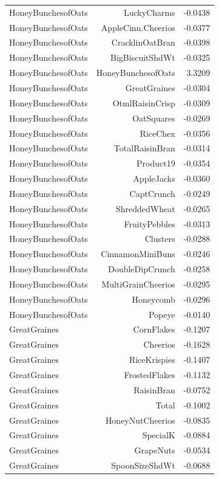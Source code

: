 \begin{longtable}{@{}lrr@{}}
HoneyBunchesofOats & LuckyCharms & -0.0438 \\
HoneyBunchesofOats & AppleCinn.Cheerios & -0.0377 \\
HoneyBunchesofOats & CracklinOatBran & -0.0398 \\
HoneyBunchesofOats & BigBiscuitShdWt & -0.0325 \\
HoneyBunchesofOats & HoneyBunchesofOats & 3.3209 \\
HoneyBunchesofOats & GreatGraines & -0.0304 \\
HoneyBunchesofOats & OtmlRaisinCrisp & -0.0309 \\
HoneyBunchesofOats & OatSquares & -0.0269 \\
HoneyBunchesofOats & RiceChex & -0.0356 \\
HoneyBunchesofOats & TotalRaisinBran & -0.0314 \\
HoneyBunchesofOats & Product19 & -0.0354 \\
HoneyBunchesofOats & AppleJacks & -0.0360 \\
HoneyBunchesofOats & CaptCrunch & -0.0249 \\
HoneyBunchesofOats & ShreddedWheat & -0.0265 \\
HoneyBunchesofOats & FruityPebbles & -0.0313 \\
HoneyBunchesofOats & Clusters & -0.0288 \\
HoneyBunchesofOats & CinnamonMiniBuns & -0.0246 \\
HoneyBunchesofOats & DoubleDipCrunch & -0.0258 \\
HoneyBunchesofOats & MultiGrainCheerios & -0.0295 \\
HoneyBunchesofOats & Honeycomb & -0.0296 \\
HoneyBunchesofOats & Popeye & -0.0140 \\
GreatGraines & CornFlakes & -0.1207 \\
GreatGraines & Cheerios & -0.1628 \\
GreatGraines & RiceKrispies & -0.1407 \\
GreatGraines & FrostedFlakes & -0.1132 \\
GreatGraines & RaisinBran & -0.0752 \\
GreatGraines & Total & -0.1002 \\
GreatGraines & HoneyNutCheerios & -0.0835 \\
GreatGraines & SpecialK & -0.0884 \\
GreatGraines & GrapeNuts & -0.0534 \\
GreatGraines & SpoonSizeShdWt & -0.0688 \\

\end{longtable}
